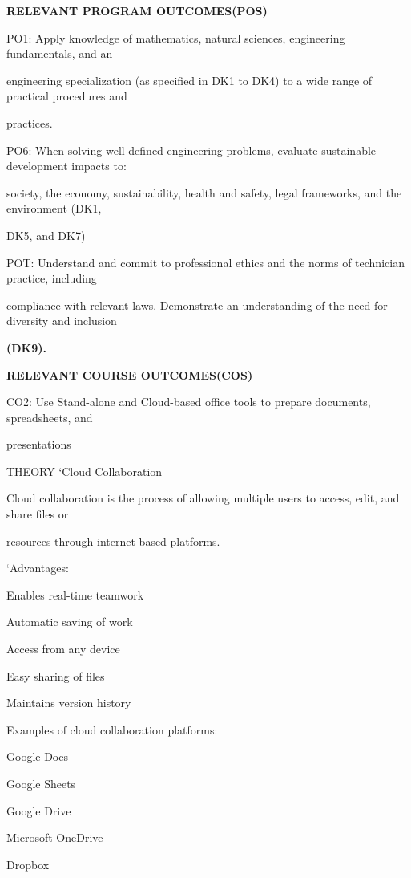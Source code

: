 \documentclass[10pt,a4paper]{article}
\begin{document}
\medskip\noindent\textbf{RELEVANT PROGRAM OUTCOMES(POS)}\par
\noindent PO1: Apply knowledge of mathematics, natural sciences, engineering fundamentals, and an\par
\noindent engineering specialization (as specified in DK1 to DK4) to a wide range of practical procedures and\par
\noindent practices.\par
\noindent PO6: When solving well-defined engineering problems, evaluate sustainable development impacts to:\par
\noindent society, the economy, sustainability, health and safety, legal frameworks, and the environment (DK1,\par
\noindent DK5, and DK7)\par
\noindent POT: Understand and commit to professional ethics and the norms of technician practice, including\par
\noindent compliance with relevant laws. Demonstrate an understanding of the need for diversity and inclusion\par
\medskip\noindent\textbf{(DK9).}\par

\medskip\noindent\textbf{RELEVANT COURSE OUTCOMES(COS)}\par
\noindent CO2: Use Stand-alone and Cloud-based office tools to prepare documents, spreadsheets, and\par
\noindent presentations\par
\noindent THEORY ‘Cloud Collaboration\par
\noindent Cloud collaboration is the process of allowing multiple users to access, edit, and share files or\par
\noindent resources through internet-based platforms.\par

\noindent ‘Advantages:\par
\noindent\textbullet\; Enables real-time teamwork\par
\noindent\textbullet\; Automatic saving of work\par
\noindent\textbullet\; Access from any device\par
\noindent\textbullet\; Easy sharing of files\par
\noindent\textbullet\; Maintains version history\par

\noindent Examples of cloud collaboration platforms:\par
\noindent\textbullet\; Google Docs\par
\noindent\textbullet\; Google Sheets\par
\noindent\textbullet\; Google Drive\par
\noindent\textbullet\; Microsoft OneDrive\par
\noindent\textbullet\; Dropbox\par
\end{document}
